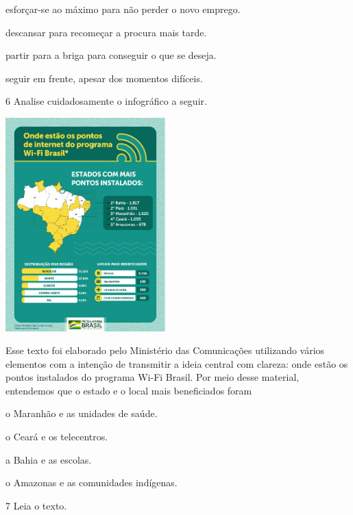 \begin{escolha}
\item esforçar-se ao máximo para não perder o novo emprego.

\item descansar para recomeçar a procura mais tarde.

\item partir para a briga para conseguir o que se deseja.

\item seguir em frente, apesar dos momentos difíceis.
\end{escolha}


\num{6} Analise cuidadosamente o infográfico a seguir.

\includegraphics[width=2.43333in,height=3.24514in]{./media/simulados/image7.png}

Esse texto foi elaborado pelo Ministério das Comunicações utilizando
vários elementos com a intenção de transmitir a ideia central com
clareza: onde estão os pontos instalados do programa Wi-Fi Brasil. Por
meio desse material, entendemos que o estado e o local mais beneficiados
foram

\begin{escolha}
\item o Maranhão e as unidades de saúde.

\item o Ceará e os telecentros.

\item a Bahia e as escolas.

\item o Amazonas e as comunidades indígenas.
\end{escolha}

\num{7} Leia o texto.

